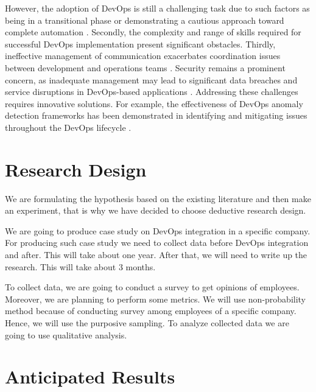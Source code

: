 \documentclass[oneside,final,12pt,a4paper]{extreport}
\begin{document}
However, the adoption of DevOps is still a challenging task due to such factors as being in a transitional phase or demonstrating a cautious approach toward complete automation \cite{12}. Secondly, the complexity and range of skills required for successful DevOps implementation present significant obstacles. Thirdly, ineffective management of communication exacerbates coordination issues between development and operations teams \cite{7}. Security remains a prominent concern, as inadequate management may lead to significant data breaches and service disruptions in DevOps-based applications \cite{14}. Addressing these challenges requires innovative solutions. For example, the effectiveness of DevOps anomaly detection frameworks has been demonstrated in identifying and mitigating issues throughout the DevOps lifecycle \cite{13}.

\section{Research Design}

We are formulating the hypothesis based on the existing literature and then make an experiment, that is why we have decided to choose deductive research design.

We are going to produce case study on DevOps integration in a specific company. For producing such case study we need to collect data before DevOps integration and after. This will take about one year. After that, we will need to write up the research. This will take about 3 months.


To collect data, we are going to conduct a survey to get opinions of employees. Moreover, we are planning to perform some metrics. We will use non-probability method because of conducting survey among employees of a specific company. Hence, we will use the purposive sampling. To analyze collected data we are going to use qualitative analysis.

\section{Anticipated Results}

\end{document}
